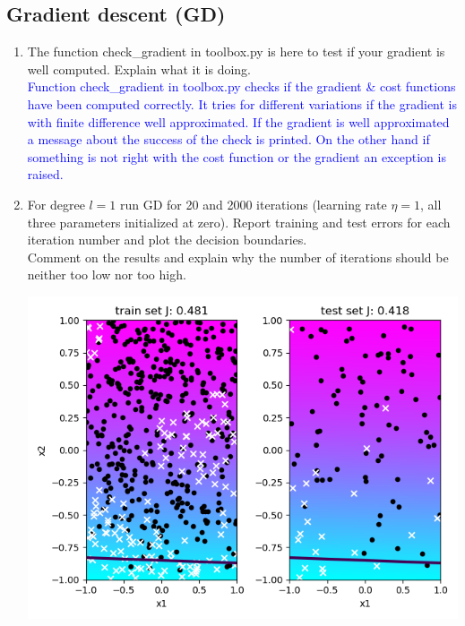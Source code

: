 \documentclass[a4paper]{article}
\begin{document}
\subsection{Gradient descent (GD)}
\begin{enumerate}
\item The function check\_gradient in toolbox.py is here to test if your gradient is well computed. Explain what it is doing.\\
\textcolor{blue}{Function check\_gradient in toolbox.py checks if the gradient \& cost functions have been computed correctly. It tries for different variations  if the gradient is with finite difference well approximated. If the gradient is well approximated a message about the success of the check is printed. On the other hand if something is not right with the cost function or the gradient an exception is raised.}
\item For degree $ l = 1$ run GD for 20 and 2000 iterations (learning rate $\eta = 1$, all three parameters initialized at zero). Report training and test errors for each iteration number and plot the decision boundaries.\\
Comment on the results and explain why the number of iterations should be neither too low nor too high.\\
\begin{minipage}[b]{0.4\textwidth}
  \vspace{10pt}
              \includegraphics[scale=0.35]{plots/gradient_descent_1_1_20.png}
				\captionsetup{justification=centering}
    \label{gradient_descent_1_1_20}

\end{minipage}
\end{enumerate}
\end{document}
